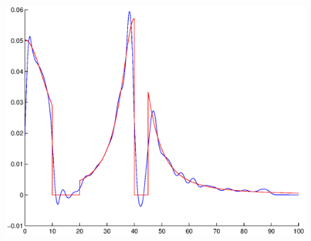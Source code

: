 \documentclass[A4paper,11pt]{article}
\theoremstyle{definition}
\begin{document}
\begin{figure}[H]
\begin{minipage}{.33\textwidth}
  \vspace{0.2cm}
  \includegraphics[scale=0.25]{pictures/Example9/Fig4.eps}
  \label{fig:9_4}
\end{minipage}%
\end{figure}
\end{document}
